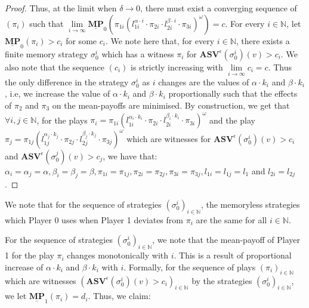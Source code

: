 \begin{proof}
    Thus, at the limit when $\delta \to 0$, there must exist a converging sequence of $(\pi_i)$  such that $\lim \limits_{i \to \infty} \underline{\mathbf{MP}}_0(\pi_{1i}(l^{\alpha \cdot i}_{1i} \cdot \pi_{2i} \cdot l^{\beta \cdot i}_{2i} \cdot \pi_{3i})^{\omega}) = c$. For every $i \in \mathbb{N}$, let $\underline{\mathbf{MP}}_0(\pi_i) > c_i$ for some $c_i$. We note here that, for every $i \in \mathbb{N}$, there exists a finite memory strategy $\sigma_0^i$ which has a witness $\pi_i$ for $ \mathbf{ASV}^{\epsilon}(\sigma_0^i)(v) > c_i$. We also note that the sequence $(c_i)$ is strictly increasing with $\lim \limits_{i \to \infty} c_i = c$. Thus the only difference in the strategy $\sigma_0^i$ as $i$ changes are the values of $\alpha \cdot k_i$ and $\beta \cdot k_i$, i.e, we increase the value of $\alpha \cdot k_i$ and $\beta \cdot k_i$ proportionally such that the effects of $\pi_2$ and $\pi_3$ on the mean-payoffs are minimised. By construction, we get that $\forall i, j \in \mathbb{N}$, for the plays $\pi_i= \pi_{1i}(l^{\alpha_i \cdot k_i}_{1i} \cdot \pi_{2i} \cdot l^{\beta_i \cdot k_i}_{2i} \cdot \pi_{3i})^{\omega}$ and the play $\pi_j= \pi_{1j}(l^{\alpha_j \cdot k_j}_{1j} \cdot \pi_{2j} \cdot l^{\beta_j \cdot k_j}_{2j} \cdot \pi_{3j})^{\omega}$ which are witnesses for $ \mathbf{ASV}^{\epsilon}(\sigma_0^i)(v) > c_i$ and $ \mathbf{ASV}^{\epsilon}(\sigma_0^j)(v) > c_j$, we have that:
    $\alpha_i = \alpha_j = \alpha, \beta_i = \beta_j = \beta, \pi_{1i} = \pi_{1j}, \pi_{2i} = \pi_{2j}, \pi_{3i} = \pi_{3j}, l_{1i} = l_{1j} = l_1$ and $l_{2i} = l_{2j}$.
\end{proof}

\begin{remark} 
    \label{RemarkStratEqual} 
    We note that for the sequence of strategies $(\sigma_0^i)_{i \in \mathbb{N}}$, the memoryless strategies which Player 0 uses when Player 1 deviates from $\pi_i$ are the same for all $i \in \mathbb{N}$.
\end{remark}

For the sequence of strategies $(\sigma_0^i)_{i \in \mathbb{N}}$, we note that the mean-payoff of Player 1 for the play $\pi_i$ changes monotonically with $i$. This is a result of proportional increase of $\alpha \cdot k_i$ and $\beta \cdot k_i$ with $i$. Formally, for the sequence of plays $(\pi_i)_{i \in \mathbb{N}}$ which are witnesses $(\mathbf{ASV}^{\epsilon}(\sigma_0^i)(v) > c_i)_{i \in \mathbb{N}}$ by the strategies $(\sigma_0^i)_{i \in \mathbb{N}}$, we let $\underline{\mathbf{MP}}_1(\pi_i) = d_i$. Thus, we claim:

